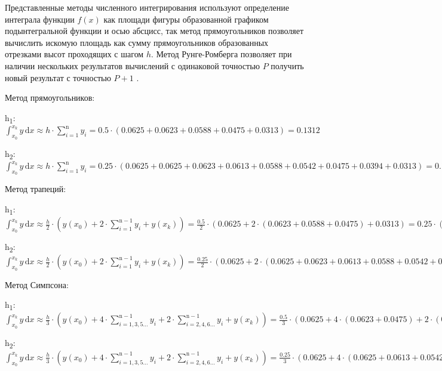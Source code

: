 \documentclass[10pt, a4paper]{scrartcl}
\begin{document}
\vspace{5mm}

Представленные методы численного интегрирования используют определение
интеграла функции \(f(x)\) как площади фигуры образованной графиком
подынтегральной функции и осью абсцисс, так метод прямоугольников
позволяет вычислить искомую площадь как сумму прямоугольников
образованных отрезками высот проходящих с шагом \(h\). Метод
Рунге-Ромберга позволяет при наличии нескольких результатов вычислений с
одинаковой точностью \(P\) получить новый результат с точностью \(P+1\)
.

Метод прямоугольников:

h\textsubscript{1}:
\(\displaystyle \int_{x_0}^{x_k} y\,\mathrm{d}x \approx h \cdot \sum_{i=1}^{\mathrm{n}} y_i = 0.5 \cdot (0.0625 + 0.0623 + 0.0588 + 0.0475 + 0.0313) = 0.1312\)

h\textsubscript{2}:
\(\displaystyle \int_{x_0}^{x_k} y\,\mathrm{d}x \approx h \cdot \sum_{i=1}^{\mathrm{n}} y_i = 0.25 \cdot (0.0625 + 0.0625 + 0.0623 + 0.0613 + 0.0588 + 0.0542 + 0.0475 + 0.0394 + 0.0313) = 0.12\)

\vspace{5mm}

Метод трапеций:

h\textsubscript{1}:
\(\displaystyle \int_{x_0}^{x_k} y\,\mathrm{d}x \approx \frac{h}{2} \cdot (y(x_0) + 2 \cdot \sum_{i=1}^{\mathrm{n}-1} y_i + y(x_k)) = \frac{0.5}{2} \cdot (0.0625 + 2 \cdot (0.0623 + 0.0588 + 0.0475) + 0.0313 ) = 0.25 \cdot (0.0625 + 2 \cdot 0.1686 + 0.0313 ) = 0.1077\)

h\textsubscript{2}:
\(\displaystyle \int_{x_0}^{x_k} y\,\mathrm{d}x \approx \frac{h}{2} \cdot (y(x_0) + 2 \cdot \sum_{i=1}^{\mathrm{n}-1} y_i + y(x_k)) = \frac{0.25}{2} \cdot (0.0625 + 2 \cdot (0.0625 + 0.0623 + 0.0613 + 0.0588 + 0.0542 + 0.0475 + 0.0394) + 0.0313 ) = 0.125 \cdot (0.0625 + 2 \cdot 0.386 + 0.0313 ) = 0.1082\)

\vspace{5mm}

Метод Симпсона:

h\textsubscript{1}:
\(\displaystyle \int_{x_0}^{x_k} y\,\mathrm{d}x \approx \frac{h}{3} \cdot (y(x_0) + 4 \cdot \sum_{i=1,3,5\dots}^{\mathrm{n}-1} y_i + 2 \cdot \sum_{i=2,4,6\dots}^{\mathrm{n}-1} y_i + y(x_k)) = \frac{0.5}{3} \cdot (0.0625 + 4 \cdot (0.0623 + 0.0475) + 2 \cdot (0.0588) + 0.0313 ) = 0.16667 \cdot (0.0625 + 4 \cdot 0.1098 + 2 \cdot 0.0588 + 0.0313 ) = 0.10844\)

h\textsubscript{2}:
\(\displaystyle \int_{x_0}^{x_k} y\,\mathrm{d}x \approx \frac{h}{3} \cdot (y(x_0) + 4 \cdot \sum_{i=1,3,5\dots}^{\mathrm{n}-1} y_i + 2 \cdot \sum_{i=2,4,6\dots}^{\mathrm{n}-1} y_i + y(x_k)) = \frac{0.25}{3} \cdot (0.0625 + 4 \cdot (0.0625 + 0.0613 + 0.0542 + 0.0394) + 2 \cdot (0.0623 + 0.0588 + 0.0475) + 0.0313 ) = 0.08333 \cdot (0.0625 + 4 \cdot 0.2174 + 2 \cdot 0.1686 + 0.0313 ) = 0.10838\)
\end{document}
